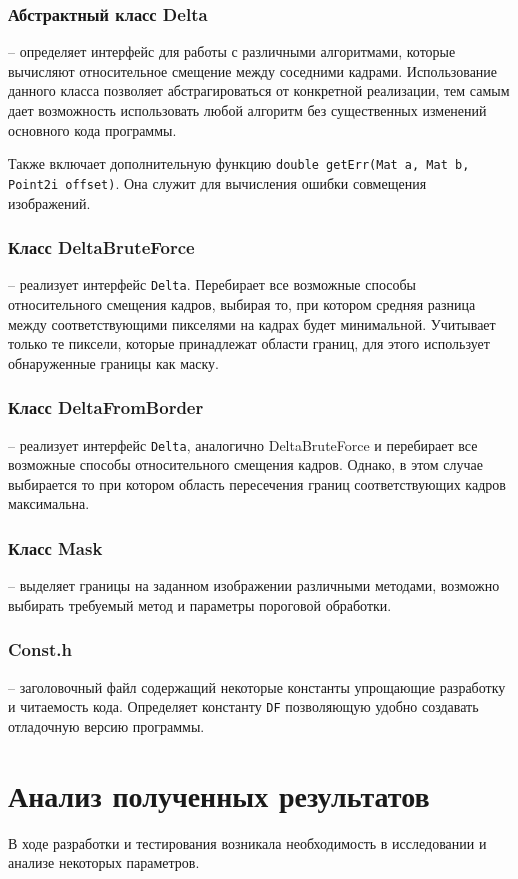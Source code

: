 \subsubsection{Абстрактный класс Delta~}
-- определяет интерфейс для работы с различными алгоритмами, которые вычисляют относительное смещение между соседними кадрами. Использование данного класса позволяет абстрагироваться от конкретной реализации, тем самым дает возможность использовать любой алгоритм без существенных изменений основного кода программы. 

Также включает дополнительную функцию \texttt{double getErr(Mat a, Mat b, Point2i offset)}. Она служит для вычисления ошибки совмещения изображений.
\subsubsection{Класс DeltaBruteForce~}
--  реализует интерфейс \texttt{Delta}. Перебирает все возможные способы относительного смещения кадров, выбирая то, при котором средняя разница между соответствующими пикселями на кадрах будет минимальной. Учитывает только те пиксели, которые принадлежат области границ, для этого использует обнаруженные границы как маску.
\subsubsection{Класс DeltaFromBorder~}
-- реализует интерфейс \texttt{Delta}, аналогично DeltaBruteForce и перебирает все возможные способы относительного смещения кадров. Однако,  в этом случае выбирается то при котором область пересечения границ соответствующих кадров максимальна.
\subsubsection{Класс Mask~}
-- выделяет границы на заданном изображении различными методами, возможно выбирать требуемый метод и параметры пороговой обработки.
\subsubsection{Const.h~}
-- заголовочный файл содержащий некоторые константы упрощающие разработку и читаемость кода. Определяет константу \texttt{DF} позволяющую удобно создавать отладочную версию программы.
\section{Анализ полученных результатов}
В ходе разработки и тестирования возникала необходимость в исследовании и анализе некоторых параметров. 
